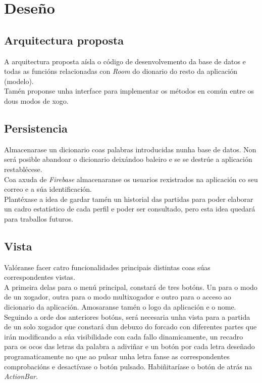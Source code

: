 \chapter{Deseño}
\label{chap:deseño}
\section {Arquitectura proposta}
A arquitectura proposta aísla o código de desenvolvemento da base de datos e todas as funcións relacionadas con \textit{Room} do dionario do resto da aplicación (modelo).\\
Tamén proponse unha interface para implementar os métodos en común entre os dous modos de xogo.


\section {Persistencia}
Almacenarase un dicionario coas palabras introducidas nunha base de datos. Non será posible abandoar o dicionario deixándoo baleiro e se se destrúe a aplicación restablécese. \\

Coa axuda de \textit{Firebase} almacenaranse os usuarios rexistrados na aplicación co seu correo e a súa identificación. \\
Plantéxase a idea de gardar tamén un historial das partidas para poder elaborar un cadro estatístico de cada perfil e poder ser consultado, pero esta idea quedará para traballos futuros.

\section {Vista}
Valóranse facer catro funcionalidades principais distintas coas súas correspondentes vistas.\\

A primeira delas para o menú principal, constará de tres botóns. Un para o modo de un xogador, outra para o modo multixogador e outro para o acceso ao dicionario da aplicación. Amosaranse tamén o logo da aplicación e o nome.\\

Seguindo a orde dos anteriores botóns, será necesaria unha vista para a partida de un solo xogador que constará dun debuxo do forcado con diferentes partes que irán modificando a súa visibilidade con cada fallo dinamicamente, un recadro para os ocos das letras da palabra a adiviñar e un botón por cada letra deseñado programaticamente no que ao pulsar unha letra fanse as correspondentes comprobacións e desactívase o botón pulsado. Habiñitaríase o botón de atrás na \textit{ActionBar}. \\

